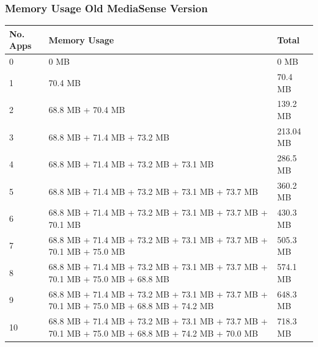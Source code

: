 \subsubsection{Memory Usage Old MediaSense Version}
\begin{center}
    \begin{tabular}{ | l | p{9cm} | l |}
    \hline
    No. Apps 								& Memory Usage 																									& Total\\ \hline
    0 													& 0 MB 																											& 0 MB\\ \hline
    1 													& 70.4 MB 																										& 70.4 MB\\ \hline
    2 													& 68.8 MB + 70.4 MB																								& 139.2 MB\\ \hline
    3 													& 68.8 MB + 71.4 MB + 73.2 MB 																					& 213.04 MB\\ \hline
    4 													& 68.8 MB + 71.4 MB + 73.2 MB + 73.1 MB																		& 286.5 MB\\ \hline
    5 													& 68.8 MB + 71.4 MB + 73.2 MB + 73.1 MB + 73.7 MB																& 360.2 MB\\ \hline
    6 													& 68.8 MB + 71.4 MB + 73.2 MB + 73.1 MB + 73.7 MB + 70.1 MB													& 430.3 MB\\ \hline
    7 													& 68.8 MB + 71.4 MB + 73.2 MB + 73.1 MB + 73.7 MB + 70.1 MB + 75.0 MB											& 505.3 MB\\ \hline
    8 													& 68.8 MB + 71.4 MB + 73.2 MB + 73.1 MB + 73.7 MB + 70.1 MB + 75.0 MB + 68.8 MB								& 574.1 MB\\ \hline
    9 													& 68.8 MB + 71.4 MB + 73.2 MB + 73.1 MB + 73.7 MB + 70.1 MB + 75.0 MB + 68.8 MB + 74.2 MB						& 648.3 MB\\ \hline
    10 													& 68.8 MB + 71.4 MB + 73.2 MB + 73.1 MB + 73.7 MB + 70.1 MB + 75.0 MB + 68.8 MB + 74.2 MB + 70.0 MB			& 718.3 MB\\ \hline
    \end{tabular}
\end{center}

